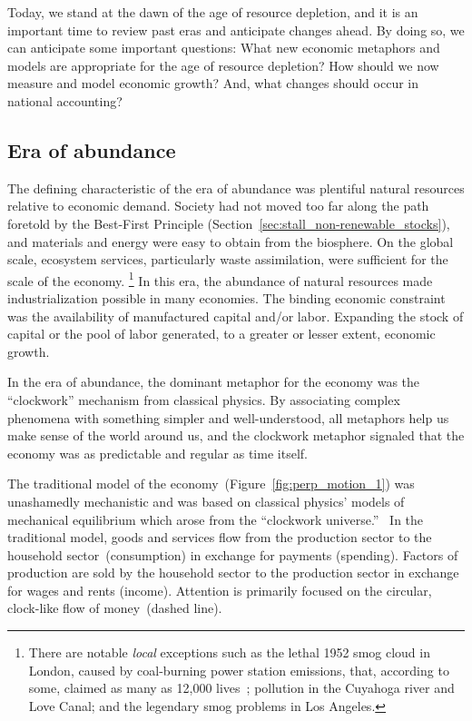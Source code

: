 Today, we stand at the dawn of the age of resource depletion, 
and it is an important time to review past eras
and anticipate changes ahead.
By doing so, we can anticipate some important questions:
What new economic metaphors and models are appropriate for the age of resource depletion?
How should we now measure and model economic growth?
And, what changes should occur in national accounting?


\subsection{Era of abundance}
\label{sec:era_of_abundance}

The defining characteristic of the era of abundance 
was plentiful natural resources relative to economic demand.
Society had not moved too far along the path foretold
by the Best-First Principle (Section~\ref{sec:stall_non-renewable_stocks}),
and materials and energy were easy to obtain from the biosphere.
On the global scale, ecosystem services,
particularly waste assimilation,
were sufficient for the scale of the economy.%
	\footnote{
	There are notable \emph{local} exceptions
	such as 
	the lethal 1952 smog cloud in London, 
	caused by coal-burning power station emissions,
	that, according to some, 
	claimed as many as 12,000 lives~\cite{Davis2002,Bell2004};
	pollution in the Cuyahoga river and Love Canal;
	and the legendary smog problems in Los Angeles.
	}
In this era, the abundance of natural resources
made industrialization possible in many economies.
The binding economic constraint was the availability of 
manufactured capital and/or labor.
Expanding the stock of capital or the pool of labor generated, 
to a greater or lesser extent, 
economic growth.

In the era of abundance, 
the dominant metaphor for the economy 
was the ``clockwork'' mechanism from classical physics.
By associating complex phenomena with
something simpler and well-understood,
all metaphors help us make sense of the world around us, and
the clockwork metaphor signaled that the economy 
was as predictable and regular as time itself.

The traditional model of the economy~(Figure~\ref{fig:perp_motion_1})
was unashamedly mechanistic
and was based on classical physics' models 
of mechanical equilibrium which arose from the 
``clockwork universe.''~\cite{Ingrao1990, Walras1892, Walras1993}
In the traditional model,
goods and services flow from the production sector
to the household sector~(consumption)
in exchange for payments (spending).
Factors of production
are sold by the household sector to the
production sector in exchange for wages and rents (income).
Attention is primarily focused on the circular, clock-like 
flow of money~(dashed line).

